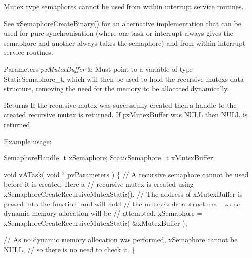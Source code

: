 Mutex type semaphores cannot be used from within interrupt service routines.

See x\+Semaphore\+Create\+Binary() for an alternative implementation that can be used for pure synchronisation (where one task or interrupt always \textquotesingle{}gives\textquotesingle{} the semaphore and another always \textquotesingle{}takes\textquotesingle{} the semaphore) and from within interrupt service routines.


\begin{DoxyParams}{Parameters}
{\em px\+Mutex\+Buffer} & Must point to a variable of type Static\+Semaphore\+\_\+t, which will then be used to hold the recursive mutex\textquotesingle{}s data structure, removing the need for the memory to be allocated dynamically.\\
\hline
\end{DoxyParams}
\begin{DoxyReturn}{Returns}
If the recursive mutex was successfully created then a handle to the created recursive mutex is returned. If px\+Mutex\+Buffer was N\+U\+LL then N\+U\+LL is returned.
\end{DoxyReturn}
Example usage\+: 
\begin{DoxyPre}
SemaphoreHandle\_t xSemaphore;
StaticSemaphore\_t xMutexBuffer;\end{DoxyPre}



\begin{DoxyPre}void vATask( void * pvParameters )
\{
   // A recursive semaphore cannot be used before it is created.  Here a
   // recursive mutex is created using xSemaphoreCreateRecursiveMutexStatic().
   // The address of xMutexBuffer is passed into the function, and will hold
   // the mutexes data structures - so no dynamic memory allocation will be
   // attempted.
   xSemaphore = xSemaphoreCreateRecursiveMutexStatic( &xMutexBuffer );\end{DoxyPre}



\begin{DoxyPre}   // As no dynamic memory allocation was performed, xSemaphore cannot be NULL,
   // so there is no need to check it.
\}
\end{DoxyPre}
 